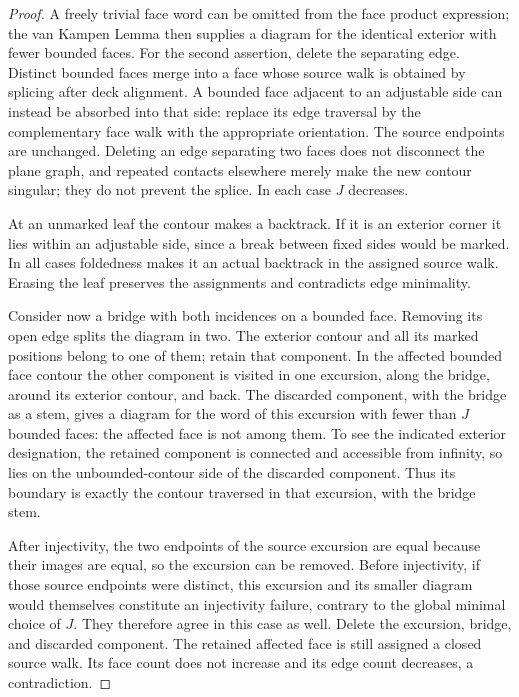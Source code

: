 \begin{proof}
A freely trivial face word can be omitted from the face product expression;
the van Kampen Lemma then supplies a diagram for the identical exterior
with fewer bounded faces.  For the second assertion, delete the separating
edge.  Distinct bounded faces merge into a face whose source walk is obtained
by splicing after deck alignment.  A bounded face adjacent to an adjustable
side can instead be absorbed into that side: replace its edge traversal by
the complementary face walk with the appropriate orientation.  The source
endpoints are unchanged.  Deleting an edge separating two faces does not
disconnect the plane graph, and repeated contacts elsewhere merely make
the new contour singular; they do not prevent the splice.  In each case
$J$ decreases.

At an unmarked leaf the contour makes a backtrack.  If it is an exterior
corner it lies within an adjustable side, since a break between fixed sides
would be marked.  In all cases foldedness makes it an actual backtrack in
the assigned source walk.  Erasing the leaf preserves the assignments and
contradicts edge minimality.

Consider now a bridge with both incidences on a bounded face.  Removing its
open edge splits the diagram in two.  The exterior contour and all its
marked positions belong to one of them; retain that component.  In the
affected bounded face contour the other component is visited in one
excursion, along the bridge, around its exterior contour, and back.  The
discarded component, with the bridge as a stem, gives a diagram for the
word of this excursion with fewer than $J$ bounded faces: the affected
face is not among them.  To see the indicated exterior designation, the
retained component is connected and accessible from infinity, so lies on
the unbounded-contour side of the discarded component.  Thus its boundary
is exactly the contour traversed in that excursion, with the bridge stem.

After injectivity, the two endpoints of the source excursion are equal
because their images are equal, so the excursion can be removed.  Before
injectivity, if those source endpoints were distinct, this excursion and
its smaller diagram would themselves constitute an injectivity failure,
contrary to the global minimal choice of $J$.  They therefore agree in
this case as well.  Delete the excursion, bridge, and discarded component.
The retained affected face is still assigned a closed source walk.  Its
face count does not increase and its edge count decreases, a contradiction.
\end{proof}

